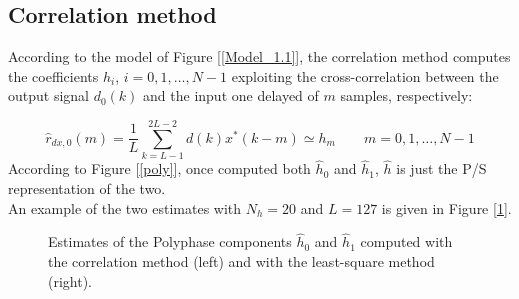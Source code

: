 \documentclass[a4paper, 12pt]{report}
\begin{document}
\subsection*{Correlation method}
According to the model of Figure [\ref{Model_1.1}], the correlation method computes the coefficients $h_i$, $i=0,1,\dots,N-1$ exploiting the cross-correlation between the output signal $d_0(k)$ and the input one delayed of $m$ samples, respectively:

\begin{equation}
\hat{r}_{dx,0}(m) = \frac{1}{L} \sum_{k=L-1}^{2L-2}d(k)x^*(k-m) \simeq h_m \quad\quad m=0,1,\dots,N-1
\end{equation}
According to Figure [\ref{poly}], once computed both $\hat{h}_0$ and $\hat{h}_1$, $\hat{h}$ is just the P/S representation of the two.\\
An example of the two estimates with $N_h=20$ and $L=127$ is given in Figure [\ref{h_cor}].

\begin{figure}[H]
	\centering
	\caption{Estimates of the Polyphase components $\hat{h}_0$ and $\hat{h}_1$ computed with the correlation method (left) and with the least-square method (right).}\label{h_cor}
\end{figure}
\end{document}
